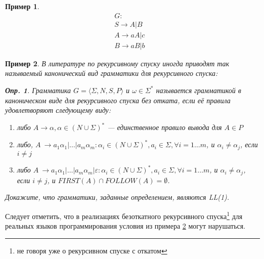 \documentclass[10pt]{article}         %
\newtheorem{definition}{Опр.}
\newtheorem{example}{Пример}
\begin{document}
	\begin{example}
		\begin{align*}
			G: & \\
			S \to A|B & \\
			A \to aA|c & \\
			B \to aB|b
		\end{align*}
		
		
	\end{example}
	
	\begin{example}\label{ex:canonical_rd}
	В литературе по рекурсивному спуску иногда приводят так называемый канонический вид грамматики для рекурсивного спуска:
	
	\begin{definition}
		Грамматика $G = \langle \Sigma, N, S, P \rangle$ и $\omega \in \Sigma^{*}$ называется грамматикой в каноническом виде для рекурсивного спуска без отката, если её правила удовлетворяют следующему виду:
		\begin{enumerate}
			\item либо $A\to \alpha, \alpha \in (N\cup{\Sigma})^*$ --- единственное правило вывода для $A \in P$ 
			\item либо, $A\ \to a_1\alpha_1|\dots|a_m\alpha_m: \alpha_i \in (N\cup{\Sigma})^* , a_i \in \Sigma,  \forall i=1\dots{m}$, и $\alpha_i \neq \alpha_j$, если $i \neq j$
			\item либо $A\ \to a_1\alpha_1|\dots|a_m\alpha_m|\varepsilon: \alpha_i \in (N\cup{\Sigma})^* , a_i \in \Sigma,  \forall i=1\dots{m}$, и $\alpha_i \neq \alpha_j$, если $i \neq j$, и $FIRST(A)\cap{FOLLOW(A)}=\emptyset$.
		\end{enumerate}
	\end{definition}
	Докажите, что грамматики, заданные определением, являются LL(1).
	\end{example}
	Следует отметить, что в реализациях безоткатного рекурсивного спуска\footnote{не говоря уже о рекурсивном спуске с откатом} для реальных языков программирования условия из примера \ref{ex:canonical_rd} могут нарушаться. 
	
	
\end{document}
